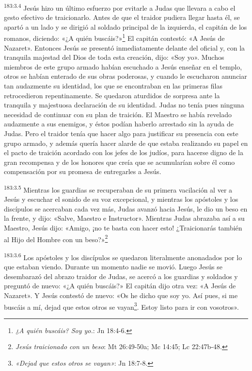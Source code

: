 \par
\textsuperscript{183:3.4} Jesús hizo un último esfuerzo por evitarle a Judas que llevara a cabo el gesto efectivo de traicionarlo. Antes de que el traidor pudiera llegar hasta él, se apartó a un lado y se dirigió al soldado principal de la izquierda, el capitán de los romanos, diciendo: «¿A quién buscáis?»\footnote{\textit{¿A quién buscáis? Soy yo.}: Jn 18:4-6.} El capitán contestó: «A Jesús de Nazaret». Entonces Jesús se presentó inmediatamente delante del oficial y, con la tranquila majestad del Dios de toda esta creación, dijo: «Soy yo». Muchos miembros de este grupo armado habían escuchado a Jesús enseñar en el templo, otros se habían enterado de sus obras poderosas, y cuando le escucharon anunciar tan audazmente su identidad, los que se encontraban en las primeras filas retrocedieron repentinamente. Se quedaron aturdidos de sorpresa ante la tranquila y majestuosa declaración de su identidad. Judas no tenía pues ninguna necesidad de continuar con su plan de traición. El Maestro se había revelado audazmente a sus enemigos, y éstos podían haberlo arrestado sin la ayuda de Judas. Pero el traidor tenía que hacer algo para justificar su presencia con este grupo armado, y además quería hacer alarde de que estaba realizando su papel en el pacto de traición acordado con los jefes de los judíos, para hacerse digno de la gran recompensa y de los honores que creía que se acumularían sobre él como compensación por su promesa de entregarles a Jesús.

\par
\textsuperscript{183:3.5} Mientras los guardias se recuperaban de su primera vacilación al ver a Jesús y escuchar el sonido de su voz excepcional, y mientras los apóstoles y los discípulos se acercaban cada vez más, Judas avanzó hacia Jesús, le dio un beso en la frente, y dijo: «Salve, Maestro e Instructor». Mientras Judas abrazaba así a su Maestro, Jesús dijo: «Amigo, ¡no te basta con hacer esto! ¿Traicionarás también al Hijo del Hombre con un beso?»\footnote{\textit{Jesús traicionado con un beso}: Mt 26:49-50a; Mc 14:45; Lc 22:47b-48.}

\par
\textsuperscript{183:3.6} Los apóstoles y los discípulos se quedaron literalmente anonadados por lo que estaban viendo. Durante un momento nadie se movió. Luego Jesús se desembarazó del abrazo traidor de Judas, se acercó a los guardias y soldados y preguntó de nuevo: «¿A quién buscáis?» El capitán dijo otra vez: «A Jesús de Nazaret». Y Jesús contestó de nuevo: «Os he dicho que soy yo. Así pues, si me buscáis a mí, dejad que estos otros se vayan\footnote{\textit{«Dejad que estos otros se vayan»}: Jn 18:7-8.}. Estoy listo para ir con vosotros».

